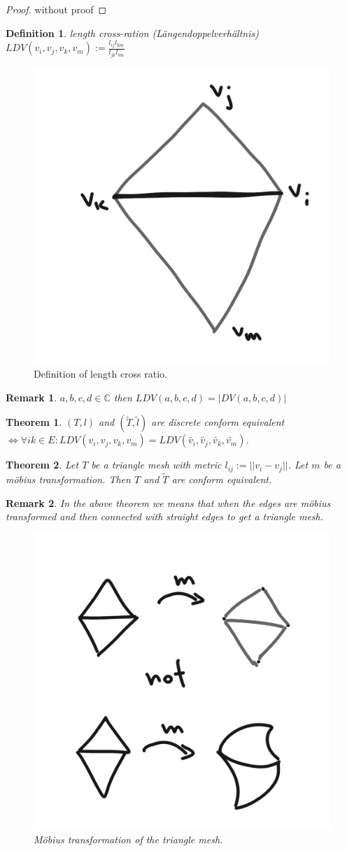 \documentclass[]{article}
\newtheorem{theorem}{Theorem}
\newtheorem{definition}{Definition}
\newtheorem{remark}{Remark}
\begin{document}
\begin{proof}
	without proof
\end{proof}

\begin{definition}
	length cross-ration (Längendoppelverhältnis) $LDV(v_i, v_j, v_k, v_m) := \frac{l_{ij}l_{km}}{l_{jk}l_{mi}}$
\end{definition}

\begin{figure}[h!]
	\centering
	\includegraphics[width=0.3\linewidth]{figures/length_cross_ratio}
	\caption{Definition of length cross ratio.}
	\label{fig:length_cross_ratio}
\end{figure}

\begin{remark}
	$a,b,c,d \in \mathbb{C}$ then $LDV(a,b,c,d) = |DV(a,b,c,d)|$
\end{remark}

\begin{theorem}
	$(T,l)$ and $(\tilde{T}, \tilde{l})$ are discrete conform equivalent $\iff \forall ik \in E: LDV(v_i, v_j, v_k, v_m) = LDV(\tilde{v_i}, \tilde{v_j}, \tilde{v_k}, \tilde{v_m})$.
\end{theorem}

\begin{theorem}
	Let $T$ be a triangle mesh with metric $l_{ij} := ||v_i - v_j||$. Let $m$ be a möbius transformation. Then $T$ and $\tilde{T}$ are conform equivalent.
\end{theorem}

\begin{remark}
	In the above theorem we means that when the edges are möbius transformed and then connected with straight edges to get a triangle mesh.
	
	\begin{figure}[h!]
		\centering
		\includegraphics[width=0.3\linewidth]{figures/moebius_transformation_triangle_mesh}
		\caption{Möbius transformation of the triangle mesh.}
		\label{fig:moebius_transformation_triangle_mesh}
	\end{figure}
\end{remark}
\end{document}

